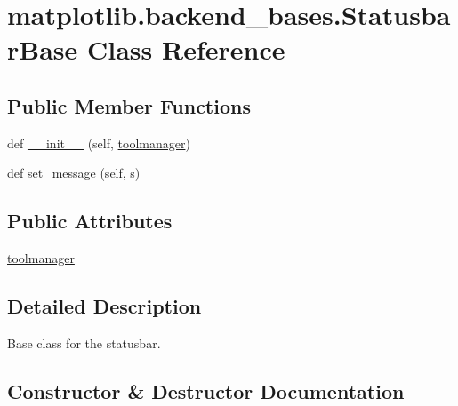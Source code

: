 \hypertarget{classmatplotlib_1_1backend__bases_1_1StatusbarBase}{}\section{matplotlib.\+backend\+\_\+bases.\+Statusbar\+Base Class Reference}
\label{classmatplotlib_1_1backend__bases_1_1StatusbarBase}
\subsection*{Public Member Functions}
\begin{DoxyCompactItemize}
\item 
def \hyperlink{classmatplotlib_1_1backend__bases_1_1StatusbarBase_acb708ea1854df3fd182d5bf12d58050c}{\+\_\+\+\_\+init\+\_\+\+\_\+} (self, \hyperlink{classmatplotlib_1_1backend__bases_1_1StatusbarBase_af2c8b0c5a4b830927801a126fbab1d73}{toolmanager})
\item 
def \hyperlink{classmatplotlib_1_1backend__bases_1_1StatusbarBase_aa82ba5daacce29b68c5890122270defe}{set\+\_\+message} (self, s)
\end{DoxyCompactItemize}
\subsection*{Public Attributes}
\begin{DoxyCompactItemize}
\item 
\hyperlink{classmatplotlib_1_1backend__bases_1_1StatusbarBase_af2c8b0c5a4b830927801a126fbab1d73}{toolmanager}
\end{DoxyCompactItemize}


\subsection{Detailed Description}
\begin{DoxyVerb}Base class for the statusbar.\end{DoxyVerb}
 

\subsection{Constructor \& Destructor Documentation}
\mbox{\label{classmatplotlib_1_1backend__bases_1_1StatusbarBase_acb708ea1854df3fd182d5bf12d58050c}} 
